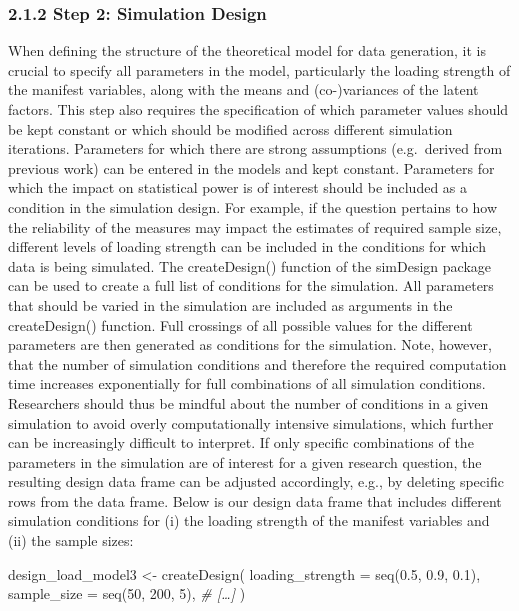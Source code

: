 \documentclass[
  man,floatsintext]{apa6}
\newenvironment{Shaded}{\begin{snugshade}}{\end{snugshade}}
\newcommand{\AttributeTok}[1]{\textcolor[rgb]{0.77,0.63,0.00}{#1}}
\newcommand{\CommentTok}[1]{\textcolor[rgb]{0.56,0.35,0.01}{\textit{#1}}}
\newcommand{\DecValTok}[1]{\textcolor[rgb]{0.00,0.00,0.81}{#1}}
\newcommand{\FloatTok}[1]{\textcolor[rgb]{0.00,0.00,0.81}{#1}}
\newcommand{\FunctionTok}[1]{\textcolor[rgb]{0.00,0.00,0.00}{#1}}
\newcommand{\NormalTok}[1]{#1}
\newcommand{\OtherTok}[1]{\textcolor[rgb]{0.56,0.35,0.01}{#1}}
\begin{document}
\hypertarget{step-2-simulation-design}{%
\subsubsection{2.1.2 Step 2: Simulation Design}\label{step-2-simulation-design}}

When defining the structure of the theoretical model for data generation, it is crucial to specify all parameters in the model, particularly the loading strength of the manifest variables, along with the means and (co-)variances of the latent factors. This step also requires the specification of which parameter values should be kept constant or which should be modified across different simulation iterations. Parameters for which there are strong assumptions (e.g.~derived from previous work) can be entered in the models and kept constant. Parameters for which the impact on statistical power is of interest should be included as a condition in the simulation design. For example, if the question pertains to how the reliability of the measures may impact the estimates of required sample size, different levels of loading strength can be included in the conditions for which data is being simulated. The createDesign() function of the simDesign package can be used to create a full list of conditions for the simulation. All parameters that should be varied in the simulation are included as arguments in the createDesign() function. Full crossings of all possible values for the different parameters are then generated as conditions for the simulation. Note, however, that the number of simulation conditions and therefore the required computation time increases exponentially for full combinations of all simulation conditions. Researchers should thus be mindful about the number of conditions in a given simulation to avoid overly computationally intensive simulations, which further can be increasingly difficult to interpret. If only specific combinations of the parameters in the simulation are of interest for a given research question, the resulting design data frame can be adjusted accordingly, e.g., by deleting specific rows from the data frame. Below is our design data frame that includes different simulation conditions for (i) the loading strength of the manifest variables and (ii) the sample sizes:

\begin{Shaded}
\begin{Highlighting}[]
\NormalTok{design\_load\_model3 }\OtherTok{\textless{}{-}} \FunctionTok{createDesign}\NormalTok{(}
  \AttributeTok{loading\_strength =} \FunctionTok{seq}\NormalTok{(}\FloatTok{0.5}\NormalTok{, }\FloatTok{0.9}\NormalTok{, }\FloatTok{0.1}\NormalTok{),}
  \AttributeTok{sample\_size =} \FunctionTok{seq}\NormalTok{(}\DecValTok{50}\NormalTok{, }\DecValTok{200}\NormalTok{, }\DecValTok{5}\NormalTok{),}
\CommentTok{\# […]}
\NormalTok{)}
\end{Highlighting}
\end{Shaded}
\end{document}
